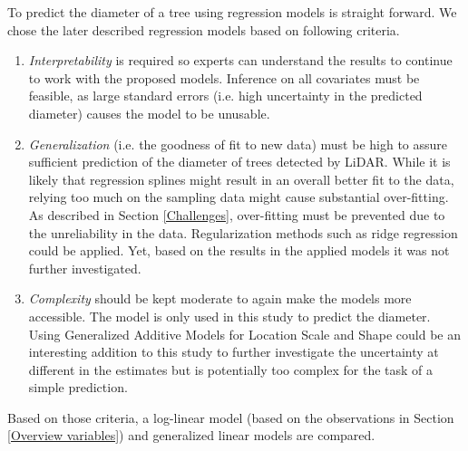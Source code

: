 
To predict the diameter of a tree using regression models is straight forward. We chose the later described regression models based on following criteria. \\

\renewcommand{\labelenumi}{\arabic{enumi}.}
\begin{enumerate}

\item \textit{Interpretability} is required so experts can understand the results to continue to work with the proposed models. Inference on all covariates must be feasible, as large standard errors (i.e. high uncertainty in the predicted diameter) causes the model to be unusable.

\item \textit{Generalization} (i.e. the goodness of fit to new data) must be high to assure sufficient prediction of the diameter
of trees detected by LiDAR. While it is likely that regression splines might result in an overall better fit to the data,
relying too much on the sampling data might cause substantial over-fitting. As described in Section \ref{Challenges},
over-fitting must be prevented due to the unreliability in the data. Regularization methods such as ridge
regression could be applied. Yet, based on the results in the applied models it was not further investigated.

\item \textit{Complexity} should be kept moderate to again make the models more accessible. The model is only used in
this study to predict the diameter. Using Generalized Additive Models for Location Scale and Shape could be an
interesting addition to this study to further investigate the uncertainty at different in the estimates but is potentially too
complex for the task of a simple prediction.

\end{enumerate}

Based on those criteria, a log-linear model (based on the observations in Section \ref{Overview variables}) and generalized linear models are
compared.